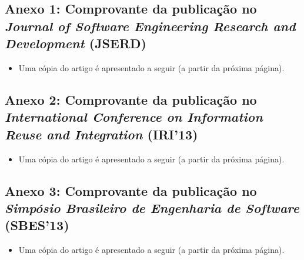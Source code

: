 \subsection*{Anexo 1: Comprovante da publicação no \emph{Journal of Software Engineering Research and Development} (JSERD)} \label{anexo:comprovante_JSERD}


\begin{itemize}
	\item Uma cópia do artigo é apresentado a seguir (a partir da próxima página).
\end{itemize}
\clearpage



\subsection*{Anexo 2: Comprovante da publicação no \emph{International Conference on Information Reuse and Integration} (IRI'13)} \label{anexo:comprovante_IRI_TEUS}

\begin{itemize}
	\item Uma cópia do artigo é apresentado a seguir (a partir da próxima página).
\end{itemize}
\clearpage



\subsection*{Anexo 3: Comprovante da publicação no \emph{Simpósio Brasileiro de Engenharia de Software} (SBES'13)} \label{anexo:comprovante_SBES_13}

\begin{itemize}
	\item Uma cópia do artigo é apresentado a seguir (a partir da próxima página).
\end{itemize}
\clearpage


